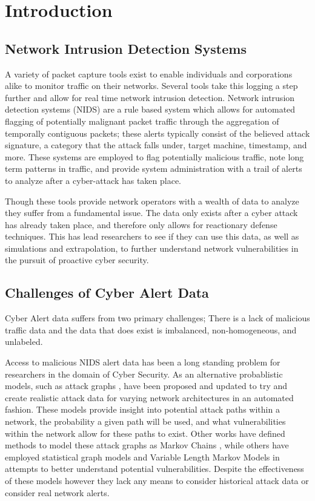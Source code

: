 \chapter{Introduction}

\section{Network Intrusion Detection Systems}
A variety of packet capture tools exist to enable individuals and corporations alike to monitor traffic on their networks. Several tools take this logging a step further and allow for real time network intrusion detection. Network intrusion detection systems (NIDS) are a rule based system which allows for automated flagging of potentially malignant packet traffic through the aggregation of temporally contiguous packets;  these alerts typically consist of the believed attack signature, a category that the attack falls under, target machine, timestamp, and more. These systems are employed to flag potentially malicious traffic, note long term patterns in traffic, and provide system administration with a trail of alerts to analyze after a cyber-attack has taken place. 

Though these tools provide network operators with a wealth of data to analyze they suffer from a fundamental issue. The data only exists after a cyber attack has already taken place, and therefore only allows for reactionary defense techniques. This has lead researchers to see if they can use this data, as well as simulations and extrapolation, to further understand network vulnerabilities in the pursuit of proactive cyber security. 

\section{Challenges of Cyber Alert Data}
Cyber Alert data suffers from two primary challenges; There is a lack of malicious traffic data and the data that does exist is imbalanced, non-homogeneous, and unlabeled. 

Access to malicious NIDS alert data has been a long standing problem for researchers in the domain of Cyber Security. As an alternative probablistic models, such as attack graphs \cite{Qin2004, Wang2006, Noel2009}, have been proposed and updated to try and create realistic attack data for varying network architectures in an automated fashion. These models provide insight into potential attack paths within a network, the probability a given path will be used, and what vulnerabilities within the network allow for these paths to exist. Other works have defined methods to model these attack graphs as Markov Chains \cite{Li2017}, while others have employed statistical graph models \cite{Du2014} and Variable Length Markov Models \cite{Fava2008} in attempts to better understand potential vulnerabilities. Despite the effectiveness of these models however they lack any means to consider historical attack data or consider real network alerts. 

